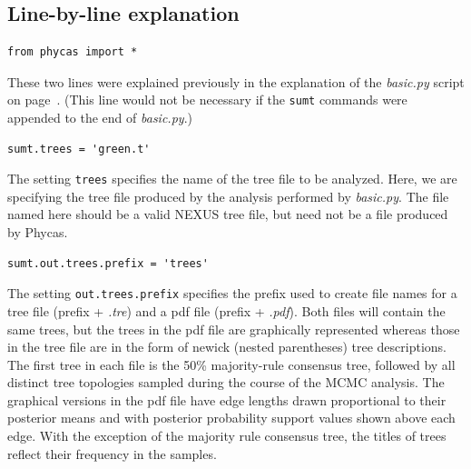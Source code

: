 \documentclass[10pt]{article}
\newcommand{\pathname}[1]{{\em #1}}				%
\newcommand{\code}[1]{{\tt #1}}					%
\newcommand{\opt}[1]{{\tt \small #1}\index{#1}}	%
\begin{document}
\subsection{Line-by-line explanation}
\begin{samepage}
\begin{verbatim}
from phycas import *
\end{verbatim}
These two lines were explained previously in the explanation of the \pathname{basic.py} script on page~\pageref{subsec:basicpyexplanation}. (This line would not be necessary if the \code{sumt} commands were appended to the end of \pathname{basic.py}.)
\end{samepage}

\begin{samepage}
\begin{verbatim}
sumt.trees = 'green.t'
\end{verbatim}
The setting \opt{trees} specifies the name of the tree file to be analyzed. Here, we are specifying the tree file produced by the analysis performed by \pathname{basic.py}. The file named here should be a valid NEXUS tree file, but need not be a file produced by Phycas.
\end{samepage}

\begin{samepage}
\begin{verbatim}
sumt.out.trees.prefix = 'trees'
\end{verbatim}
The setting \opt{out.trees.prefix} specifies the prefix used to create file names for a tree file (prefix + \pathname{.tre}) and a pdf file (prefix + \pathname{.pdf}). Both files will contain the same trees, but the trees in the pdf file are graphically represented whereas those in the tree file are in the form of newick (nested parentheses) tree descriptions. The first tree in each file is the 50\% majority-rule consensus tree, followed by all distinct tree topologies sampled during the course of the MCMC analysis. The graphical versions in the pdf file have edge lengths drawn proportional to their posterior means and with posterior probability support values shown above each edge. With the exception of the majority rule consensus tree, the titles of trees reflect their frequency in the samples. 
\end{samepage}
\end{document}
